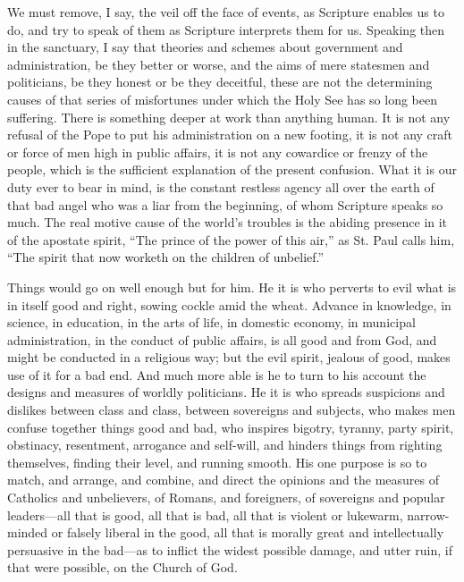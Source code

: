 We must remove, I say, the veil off the face of
events, as Scripture enables us to do, and try to speak
of them as Scripture interprets them for us. Speaking
then in the sanctuary, I say that theories and schemes
about government and administration, be they better or
worse, and the aims of mere statesmen and politicians, be
they honest or be they deceitful, these are not the
determining causes of that series of misfortunes under
which the Holy See has so long been suffering. There is
something deeper at work than anything human. It is not
any refusal of the Pope to put his administration on a
new footing, it is not any craft or force of men high in
public affairs, it is not any cowardice or frenzy of the
people, which is the sufficient explanation of the
present confusion. What it is our duty ever to bear in
mind, is the constant restless agency all over the earth
of that bad angel who was a liar from the beginning, of
whom Scripture speaks so much. The real motive cause of
the world's troubles is the abiding presence in it of the
apostate spirit, ``The prince of the power of this
air,'' as St. Paul calls him, ``The spirit that
now worketh on the children of unbelief.''

Things would go on well enough but for him. He it is
who perverts to evil what is in itself good and right,
sowing cockle amid the wheat. Advance in knowledge, in
science, in education, in the arts of life, in domestic
economy, in municipal administration, in the conduct of
public affairs, is all good and from God, and might be
conducted in a religious way; but the evil spirit,
jealous of good, makes use of it for a bad end. And much
more able is he to turn to his account the designs and
measures of worldly politicians. He it is who spreads
suspicions and dislikes between class and class, between sovereigns and subjects, who makes men confuse together
things good and bad, who inspires bigotry, tyranny, party
spirit, obstinacy, resentment, arrogance and self-will,
and hinders things from righting themselves, finding
their level, and running smooth. His one purpose is so to
match, and arrange, and combine, and direct the opinions
and the measures of Catholics and unbelievers, of Romans,
and foreigners, of sovereigns and popular
leaders—all that is good, all that is bad, all that
is violent or lukewarm, narrow-minded or falsely liberal
in the good, all that is morally great and intellectually
persuasive in the bad—as to inflict the widest
possible damage, and utter ruin, if that were possible,
on the Church of God.

